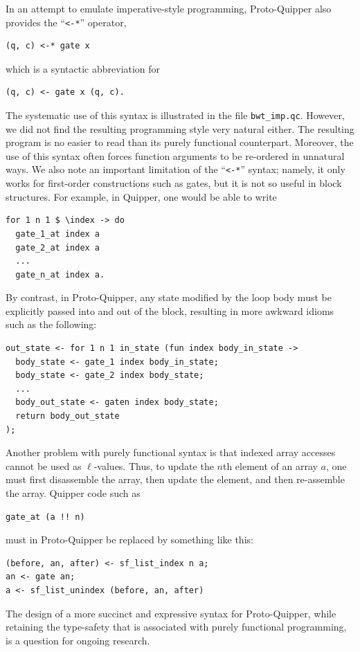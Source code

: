 \documentclass[twoside]{article}
\begin{document}
In an attempt to emulate imperative-style programming, Proto-Quipper
also provides the ``\verb!<-*!'' operator,
\begin{code}
\begin{verbatim}
(q, c) <-* gate x
\end{verbatim}
\end{code}
\noindent which is a syntactic abbreviation for
\begin{code}
\begin{verbatim}
(q, c) <- gate x (q, c).
\end{verbatim}
\end{code}
\noindent The systematic use of this syntax is illustrated in the file
\verb!bwt_imp.qc!. However, we did not find the resulting programming
style very natural either. The resulting program is no easier to read
than its purely functional counterpart. Moreover, the use of this
syntax often forces function arguments to be re-ordered in unnatural
ways. We also note an important limitation of the ``\verb!<-*!''
syntax; namely, it only works for first-order constructions such as
gates, but it is not so useful in block structures. For example, in
Quipper, one would be able to write
\begin{code}
\begin{verbatim}
for 1 n 1 $ \index -> do
  gate_1_at index a
  gate_2_at index a
  ...
  gate_n_at index a.
\end{verbatim}
\end{code}
\noindent By contrast, in Proto-Quipper, any state modified by the
loop body must be explicitly passed into and out of the block,
resulting in more awkward idioms such as the following:
\begin{code}
\begin{verbatim}
out_state <- for 1 n 1 in_state (fun index body_in_state ->
  body_state <- gate_1 index body_in_state;
  body_state <- gate_2 index body_state;
  ...
  body_out_state <- gaten index body_state;
  return body_out_state
);
\end{verbatim}
\end{code}
Another problem with purely functional syntax is that indexed array
accesses cannot be used as $\ell$-values. Thus, to update the $n$th element
of an array $a$, one must first disassemble the array, then update
the element, and then re-assemble the array. Quipper code such as
\begin{code}
\begin{verbatim}
gate_at (a !! n)
\end{verbatim}
\end{code}
\noindent must in Proto-Quipper be replaced by something like this:
\begin{code}
\begin{verbatim}
(before, an, after) <- sf_list_index n a;
an <- gate an;
a <- sf_list_unindex (before, an, after)
\end{verbatim}
\end{code}
The design of a more succinct and expressive syntax for Proto-Quipper,
while retaining the type-safety that is associated with purely
functional programming, is a question for ongoing research.
\end{document}
